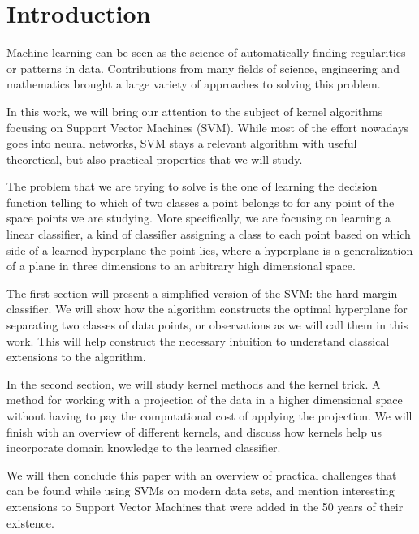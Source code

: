\section{Introduction}

Machine learning can be seen as the science of automatically finding regularities or patterns in data. Contributions from many fields of science, engineering and mathematics brought a large variety of approaches to solving this problem.

In this work, we will bring our attention to the subject of kernel algorithms focusing on Support Vector Machines (SVM). While most of the effort nowadays goes into neural networks, SVM stays a relevant algorithm with useful theoretical, but also practical properties that we will study.

The problem that we are trying to solve is the one of learning the decision function telling to which of two classes a point belongs to for any point of the space points we are studying. More specifically, we are focusing on learning a linear classifier, a kind of classifier assigning a class to each point based on which side of a learned hyperplane the point lies, where a hyperplane is a generalization of a plane in three dimensions to an arbitrary high dimensional space.

The first section will present a simplified version of the SVM: the hard margin classifier. We will show how the algorithm constructs the optimal hyperplane for separating two classes of data points, or observations as we will call them in this work. This will help construct the necessary intuition to understand classical extensions to the algorithm.

In the second section, we will study kernel methods and the kernel trick. A method for working with a projection of the data in a higher dimensional space without having to pay the computational cost of applying the projection. We will finish with an overview of different kernels, and discuss how kernels help us incorporate domain knowledge to the learned classifier.

We will then conclude this paper with an overview of practical challenges that can be found while using SVMs on modern data sets, and mention interesting extensions to Support Vector Machines that were added in the 50 years of their existence.

